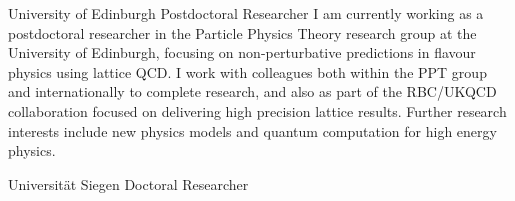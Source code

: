 \documentclass[10pt]{article} %
\begin{document}
\begin{paracol}{2}



\workposition{[10.24 -- present]}
{}
{University of Edinburgh}
{Postdoctoral Researcher}
{I am currently working as a postdoctoral researcher in the Particle Physics Theory research group at the University of Edinburgh, focusing on non-perturbative predictions in flavour physics using lattice QCD. 
    I work with colleagues both within the PPT group and internationally to complete research, and also as part of the RBC/UKQCD collaboration focused on delivering high precision lattice results. 
Further research interests include new physics models and quantum computation for high energy physics.}

\workposition{[03.21 -- 10.24]}
{}
{Universit\"{a}t Siegen}
{Doctoral Researcher}
{}





\end{paracol}
\end{document}
